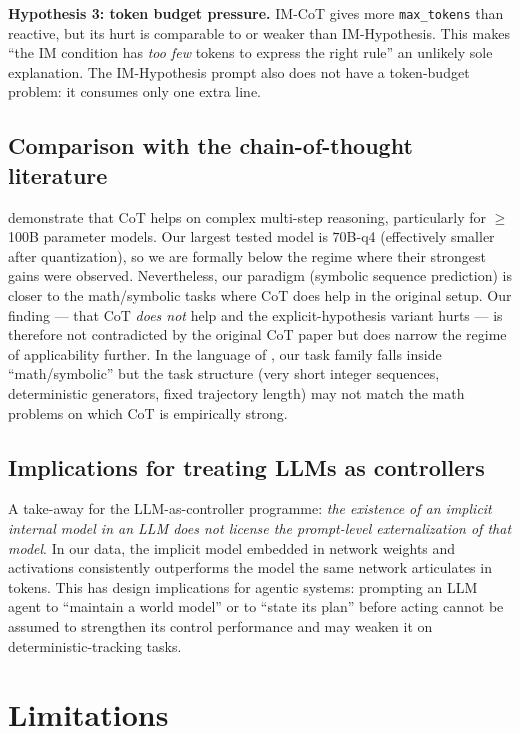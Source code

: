 \documentclass[11pt]{article}
\begin{document}
\textbf{Hypothesis 3: token budget pressure.}  IM-CoT gives more
\verb|max_tokens| than reactive, but its hurt is comparable to or
weaker than IM-Hypothesis.  This makes ``the IM condition has
\emph{too few} tokens to express the right rule'' an unlikely
sole explanation.  The IM-Hypothesis prompt also does not have a
token-budget problem: it consumes only one extra line.

\subsection{Comparison with the chain-of-thought literature}

\citet{wei2022chain} demonstrate that CoT helps on complex
multi-step reasoning, particularly for $\geq$ 100B parameter models.
Our largest tested model is $70$B-q4 (effectively smaller after
quantization), so we are formally below the regime where their
strongest gains were observed.  Nevertheless, our paradigm
(symbolic sequence prediction) is closer to the math/symbolic
tasks where CoT does help in the original setup.  Our finding ---
that CoT \emph{does not} help and the explicit-hypothesis variant
hurts --- is therefore not contradicted by the original CoT paper
but does narrow the regime of applicability further.  In the
language of \citet{sprague2024cot}, our task family
falls inside ``math/symbolic'' but the task structure (very short
integer sequences, deterministic generators, fixed
trajectory length) may not match the math problems on which CoT
is empirically strong.

\subsection{Implications for treating LLMs as controllers}

A take-away for the LLM-as-controller programme: \emph{the
existence of an implicit internal model in an LLM does not
license the prompt-level externalization of that model}.  In our
data, the implicit model embedded in network weights and
activations consistently outperforms the model the same network
articulates in tokens.  This has design implications for agentic
systems: prompting an LLM agent to ``maintain a world model'' or
to ``state its plan'' before acting cannot be assumed to
strengthen its control performance and may weaken it on
deterministic-tracking tasks.

\section{Limitations}
\label{sec:limitations}
\end{document}
